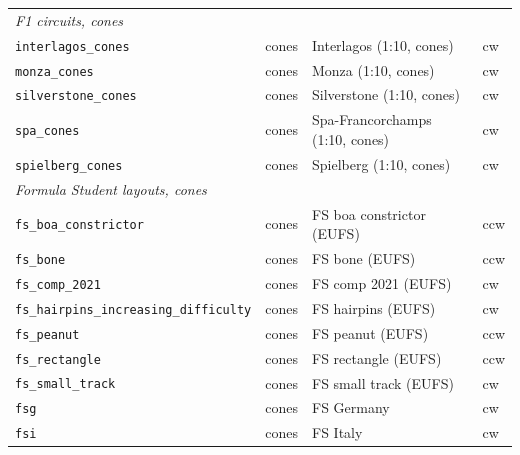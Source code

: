 \documentclass[11pt,a4paper]{article}
\begin{document}
\begin{tabularx}{\linewidth}{llXl}
\midrule
\multicolumn{4}{l}{\textit{F1 circuits, cones}} \\
\texttt{interlagos\_cones} & cones & Interlagos (1:10, cones) & cw \\
\texttt{monza\_cones} & cones & Monza (1:10, cones) & cw \\
\texttt{silverstone\_cones} & cones & Silverstone (1:10, cones) & cw \\
\texttt{spa\_cones} & cones & Spa-Francorchamps (1:10, cones) & cw \\
\texttt{spielberg\_cones} & cones & Spielberg (1:10, cones) & cw \\
\midrule
\multicolumn{4}{l}{\textit{Formula Student layouts, cones}} \\
\texttt{fs\_boa\_constrictor} & cones & FS boa constrictor (EUFS) & ccw \\
\texttt{fs\_bone} & cones & FS bone (EUFS) & ccw \\
\texttt{fs\_comp\_2021} & cones & FS comp 2021 (EUFS) & cw \\
\texttt{fs\_hairpins\_increasing\_difficulty} & cones & FS hairpins (EUFS) & cw \\
\texttt{fs\_peanut} & cones & FS peanut (EUFS) & ccw \\
\texttt{fs\_rectangle} & cones & FS rectangle (EUFS) & ccw \\
\texttt{fs\_small\_track} & cones & FS small track (EUFS) & cw \\
\texttt{fsg} & cones & FS Germany & cw \\
\texttt{fsi} & cones & FS Italy & cw \\
\bottomrule
\end{tabularx}
\end{document}
